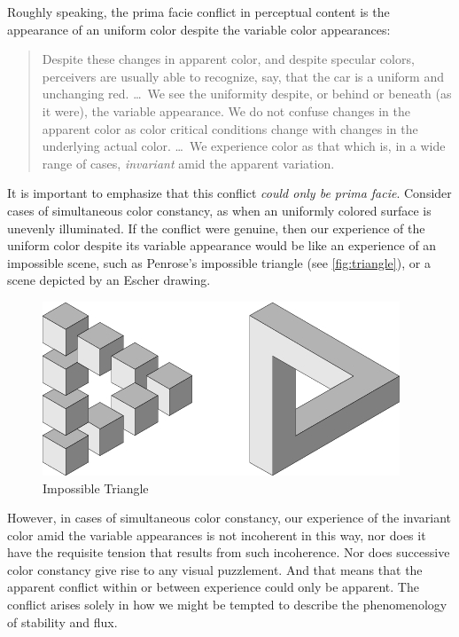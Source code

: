 \documentclass[12pt]{article}
\begin{document}
Roughly speaking, the prima facie conflict in perceptual content is the appearance of an uniform color despite the variable color appearances:
	\begin{quote}
		Despite these changes in apparent color, and despite specular colors, perceivers are usually able to recognize, say, that the car is a uniform and unchanging red. \ldots\ We see the uniformity despite, or behind or beneath (as it were), the variable appearance. We do not confuse changes in the apparent color as color critical conditions change with changes in the underlying actual color. \ldots\ We experience color as that which is, in a wide range of cases, \emph{invariant} amid the apparent variation. \citep[127]{Noe:2004fk}
	\end{quote}

It is important to emphasize that this conflict \emph{could only be prima facie}. Consider cases of simultaneous color constancy, as when an uniformly colored surface is unevenly illuminated. If the conflict were genuine, then our experience of the uniform color despite its variable appearance would be like an experience of an impossible scene, such as Penrose's \citeyearpar{Penrose:1958kx} impossible triangle (see \autoref{fig:triangle}), or a scene depicted by an Escher drawing.
	\begin{figure}[htbp]
		\centering
			\includegraphics[scale=1]{triangle.jpg}
		\caption{Impossible Triangle}
		\label{fig:triangle}
	\end{figure}
However, in cases of simultaneous color constancy, our experience of the invariant color amid the variable appearances is not incoherent in this way, nor does it have the requisite tension that results from such incoherence. Nor does successive color constancy give rise to any visual puzzlement. And that means that the apparent conflict within or between experience could only be apparent. The conflict arises solely in how we might be tempted to describe the phenomenology of stability and flux. 
\end{document}
